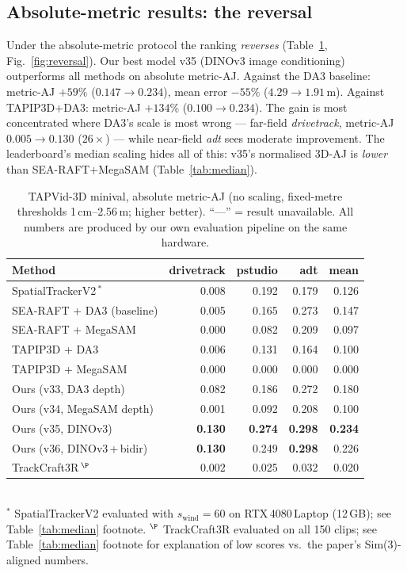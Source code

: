 \documentclass[11pt,a4paper]{article}
\begin{document}
\subsection{Absolute-metric results: the reversal}
\label{sec:abs}
Under the absolute-metric protocol the ranking \emph{reverses} (Table~\ref{tab:abs},
Fig.~\ref{fig:reversal}). Our best model v35 (DINOv3 image conditioning) outperforms
all methods on absolute metric-AJ.
Against the DA3 baseline: metric-AJ $+59\%$ ($0.147\!\to\!0.234$),
mean error $-55\%$ ($4.29\!\to\!1.91$\,m). Against TAPIP3D$+$DA3: metric-AJ
$+134\%$ ($0.100\!\to\!0.234$). The gain is most concentrated where DA3's scale is most
wrong --- far-field \emph{drivetrack}, metric-AJ $0.005\!\to\!0.130$ ($26\times$) ---
while near-field \emph{adt} sees moderate improvement.
The leaderboard's median scaling hides all of this: v35's normalised 3D-AJ is
\emph{lower} than SEA-RAFT$+$MegaSAM (Table~\ref{tab:median}).

\begin{table}[h]
\centering
\caption{TAPVid-3D minival, absolute metric-AJ (no scaling, fixed-metre thresholds 1\,cm--2.56\,m;
higher better). ``---'' = result unavailable.
All numbers are produced by our own evaluation pipeline on the same hardware.}
\label{tab:abs}
\begin{tabular}{lrrrr}
\toprule
Method & drivetrack & pstudio & adt & mean \\
\midrule
SpatialTrackerV2\,$^{*}$             & 0.008 & 0.192 & 0.179 & 0.126 \\
\midrule
SEA-RAFT + DA3 (baseline)  & 0.005 & 0.165 & 0.273 & 0.147 \\
SEA-RAFT + MegaSAM         & 0.000 & 0.082 & 0.209 & 0.097 \\
TAPIP3D + DA3              & 0.006 & 0.131 & 0.164 & 0.100 \\
TAPIP3D + MegaSAM          & 0.000 & 0.000 & 0.000 & 0.000 \\
Ours (v33, DA3 depth)      & 0.082 & 0.186 & 0.272 & 0.180 \\
Ours (v34, MegaSAM depth)  & 0.001 & 0.092 & 0.208 & 0.100 \\
Ours (v35, DINOv3)         & \textbf{0.130} & \textbf{0.274} & \textbf{0.298} & \textbf{0.234} \\
Ours (v36, DINOv3\,+\,bidir) & \textbf{0.130} & 0.249 & \textbf{0.298} & 0.226 \\
\midrule
TrackCraft3R\,$^{\P}$         & 0.002 & 0.025 & 0.032 & 0.020 \\
\bottomrule
\end{tabular}
\\[2pt]
{\footnotesize $^{*}$ SpatialTrackerV2 evaluated with $s_{\text{wind}}{=}60$ on RTX\,4080\,Laptop (12\,GB); see Table~\ref{tab:median} footnote.
$^{\P}$ TrackCraft3R evaluated on all 150 clips; see Table~\ref{tab:median} footnote for explanation of low scores vs.\ the paper's Sim(3)-aligned numbers.}
\end{table}
\end{document}
